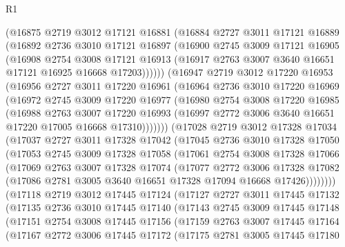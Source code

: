 \begin{lexlean}{R1}
\begin{coremodule}
    (@16875
      @2719
      @3012
      @17121
      @16881
      (@16884
        @2727
        @3011
        @17121
        @16889
        (@16892
          @2736
          @3010
          @17121
          @16897
          (@16900
            @2745
            @3009
            @17121
            @16905
            (@16908
              @2754
              @3008
              @17121
              @16913
              (@16917 @2763 @3007 @3640 @16651 @17121 @16925 @16668 @17203))))))
    (@16947
      @2719
      @3012
      @17220
      @16953
      (@16956
        @2727
        @3011
        @17220
        @16961
        (@16964
          @2736
          @3010
          @17220
          @16969
          (@16972
            @2745
            @3009
            @17220
            @16977
            (@16980
              @2754
              @3008
              @17220
              @16985
              (@16988
                @2763
                @3007
                @17220
                @16993
                (@16997 @2772 @3006 @3640 @16651 @17220 @17005 @16668 @17310)))))))
    (@17028
      @2719
      @3012
      @17328
      @17034
      (@17037
        @2727
        @3011
        @17328
        @17042
        (@17045
          @2736
          @3010
          @17328
          @17050
          (@17053
            @2745
            @3009
            @17328
            @17058
            (@17061
              @2754
              @3008
              @17328
              @17066
              (@17069
                @2763
                @3007
                @17328
                @17074
                (@17077
                  @2772
                  @3006
                  @17328
                  @17082
                  (@17086 @2781 @3005 @3640 @16651 @17328 @17094 @16668 @17426))))))))
    (@17118
      @2719
      @3012
      @17445
      @17124
      (@17127
        @2727
        @3011
        @17445
        @17132
        (@17135
          @2736
          @3010
          @17445
          @17140
          (@17143
            @2745
            @3009
            @17445
            @17148
            (@17151
              @2754
              @3008
              @17445
              @17156
              (@17159
                @2763
                @3007
                @17445
                @17164
                (@17167
                  @2772
                  @3006
                  @17445
                  @17172
                  (@17175
                    @2781
                    @3005
                    @17445
                    @17180

\end{coremodule}
\end{lexlean}
